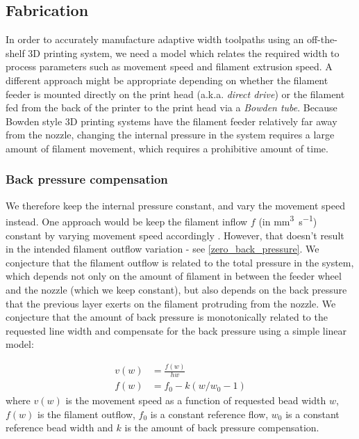 \documentclass[3p,10pt,times]{elsarticle}
\theoremstyle{definition}
\numberwithin{question}{section}
\begin{document}
{{\subsection{Fabrication}
In order to accurately manufacture adaptive width toolpaths using an off-the-shelf 3D printing system,
we need a model which relates the required width to process parameters such as movement speed and filament extrusion speed.
A different approach might be appropriate depending on whether the filament feeder is mounted directly on the print head (a.k.a. \emph{direct drive}) or the filament fed from the back of the printer to the print head via a \emph{Bowden tube}.
Because Bowden style 3D printing systems have the filament feeder relatively far away from the nozzle, changing the internal pressure in the system requires a large amount of filament movement, which requires a prohibitive amount of time.

\subsubsection{Back pressure compensation}
We therefore keep the internal pressure constant, and vary the movement speed instead.
One approach would be keep the filament inflow $f$ (in \si{\milli\meter\cubed\per\second}) constant by varying movement speed accordingly \cite{Kuipers2018}.
However, that doesn't result in the intended filament outflow variation - see \cref{zero_back_pressure}.
We conjecture that the filament outflow is related to the total pressure in the system,
which depends not only on the amount of filament in between the feeder wheel and the nozzle (which we keep constant), 
but also depends on the back pressure that the previous layer exerts on the filament protruding from the nozzle.
We conjecture that the amount of back pressure is monotonically related to the requested line width and compensate for the back pressure using a simple linear model:

\begin{align}
 v(w) &= \frac{f(w)}{h w} \\ 
 f(w) &= f_0 - k \left( w / w_0 - 1 \right)
\end{align}
where
$v(w)$ is the movement speed as a function of requested bead width $w$,
$f(w)$ is the filament outflow,
$f_0$ is a constant reference flow,
$w_0$ is a constant reference bead width
and
$k$ is the amount of back pressure compensation.

}}
\end{document}
